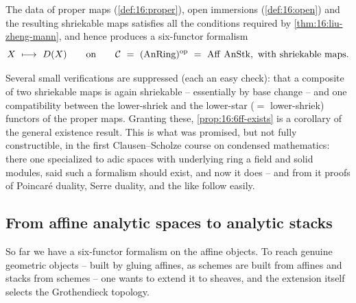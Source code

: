\begin{proposition}
\label{prop:16:6ff-exists}
The data of proper maps (\cref{def:16:proper}), open immersions (\cref{def:16:open}) and
the resulting shriekable maps satisfies all the conditions required by
\cref{thm:16:liu-zheng-mann}, and hence produces a six-functor formalism
\begin{equation*}
X\ \longmapsto\ D(X)\qquad\text{on}\qquad \mathcal C\ =\ (\AnRing)^{\mathrm{op}}\ =\ \Aff\,\AnStk,\ \text{with shriekable maps.}
\end{equation*}
\end{proposition}

\begin{remark}
\label{rmk:16:small-checks}
Several small verifications are suppressed (each an easy check): that a composite of two
shriekable maps is again shriekable -- essentially by base change -- and one
compatibility between the lower-shriek and the lower-star ($=$ lower-shriek) functors of
the proper maps. Granting these, \cref{prop:16:6ff-exists} is a corollary of the general
existence result. This is what was promised, but not fully constructible, in the first
Clausen--Scholze course on condensed mathematics: there one specialized to adic spaces
with underlying ring a field and solid modules, said such a formalism should exist, and
now it does -- and from it proofs of Poincar\'e duality, Serre duality, and the like
follow easily.
\end{remark}

\subsection{From affine analytic spaces to analytic stacks}
\label{subsec:16:topology}

So far we have a six-functor formalism on the affine objects. To reach genuine
geometric objects -- built by gluing affines, as schemes are built from affines and
stacks from schemes -- one wants to extend it to sheaves, and the extension itself
selects the Grothendieck topology.

